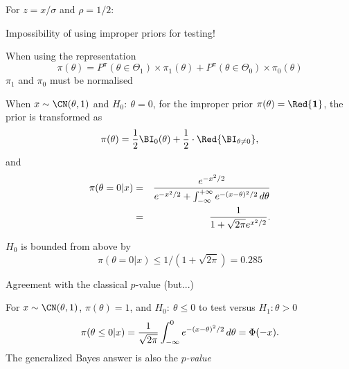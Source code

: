 \begin{slide}
For $z=x/\sigma$ and $\rho=1/2$:
 
\centerline{
}
\fin

\end{slide}\begin{slide}

Impossibility of using improper priors for testing!

\medskip\pause
{} When using the representation
$$
\pi(\theta) = P^\pi (\theta\in\Theta_1)\times\pi_1(\theta) +
              P^\pi (\theta\in\Theta_0)\times\pi_0(\theta)
$$
$\pi_1$ and $\pi_0$ must be normalised

\end{slide}\begin{slide}
 When $x\sim \CN(\theta,1)$ and $H_0:\ \theta=0$, for
the improper prior $\pi(\theta)=\Red{{\mathbf 1}}$, the prior is transformed as
$$
\pi(\theta)  = {1\over 2} \BI_{0}(\theta) + {1\over 2} \cdot \Red{{\mathbf \BI_{\theta\ne 0}}},
$$
and
\begin{eqnarray*}
\pi(\theta=0|x) &=& {e^{-x^2/2}\over e^{-x^2/2}+\int_{-\infty}^{+\infty}
   e^{-(x-\theta)^2/2} \,d\theta} \\
&=&  {1 \over 1+\sqrt{2\pi} e^{x^2/2} }.
\end{eqnarray*}
\fin

\end{slide}\begin{slide}
$H_0$ is bounded from above by 
$$
\pi(\theta=0|x) \le 1/(1+\sqrt{2\pi})=0.285
$$
\fin

\medskip
{}
Agreement with the classical $p$-value (but...)

\end{slide}\begin{slide}
 For $x\sim\CN(\theta,1)$, $\pi(\theta)=1$, 
and $H_0:\ \theta\le 0$ to test versus $H_1: \theta>0$
$$
\pi(\theta\le 0|x) =  {1\over \sqrt{2\pi} } \int_{-\infty}^0 
	e^{-(x-\theta)^2/2} \,d\theta =  \Phi(-x). 
$$
The generalized Bayes answer is also the {\it $p$-value}
\fin


\end{slide}
